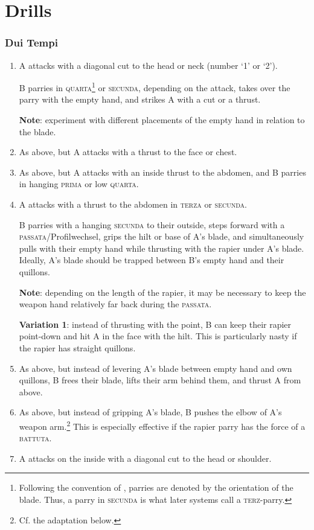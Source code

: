 \documentclass[article, 12pt, a4paper]{memoir}
\begin{document}
\section{Drills}
\subsubsection*{Dui Tempi}
\begin{enumerate}
    \item A attacks with a diagonal cut to the head or neck (number `1' or `2').

        B parries in \textsc{quarta}\footnote{Following the convention of \autocite{a.RidderligeOcAdelige1646}, parries are denoted by the orientation of the blade. Thus, a parry in \textsc{secunda} is what later systems call a \textsc{terz}-parry.} or \textsc{secunda}, depending on the attack, takes over the parry with the empty hand, and strikes A with a cut or a thrust.

        \textbf{Note}: experiment with different placements of the empty hand in relation to the blade.
    \item As above, but A attacks with a thrust to the face or chest.
    \item As above, but A attacks with an inside thrust to the abdomen, and B parries in hanging \textsc{prima} or low \textsc{quarta}.
    \item A attacks with a thrust to the abdomen in \textsc{terza} or \textsc{secunda}.

        B parries with a hanging \textsc{secunda} to their outside, steps forward with a \textsc{passata}/Profilwechsel, grips the hilt or base of A's blade, and simultaneously pulls with their empty hand while thrusting with the rapier under A's blade.
        Ideally, A's blade should be trapped between B's empty hand and their quillons.

        \textbf{Note}: depending on the length of the rapier, it may be necessary to keep the weapon hand relatively far back during the \textsc{passata}.

        \textbf{Variation 1}: instead of thrusting with the point, B can keep their rapier point-down and hit A in the face with the hilt.
        This is particularly nasty if the rapier has straight quillons.
    \item As above, but instead of levering A's blade between empty hand and own quillons, B frees their blade, lifts their arm behind them, and thrust A from above.
    \item As above, but instead of gripping A's blade, B pushes the elbow of A's weapon arm.\footnote{Cf. the  adaptation below.} This is especially effective if the rapier parry has the force  of a \textsc{battuta}.
    \item A attacks on the inside with a diagonal cut to the head or shoulder.


\end{enumerate}
\end{document}
